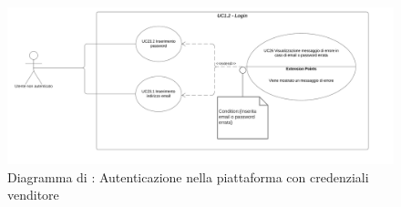 
\begin{figure}[H]
    \centering
    \includegraphics[scale=0.6]{Immagini/DiagrammiUC/UC1.2Login.png}
    \caption{Diagramma di \actualUC: Autenticazione nella piattaforma con credenziali venditore} 
    \label{fig:Login}
\end{figure}

